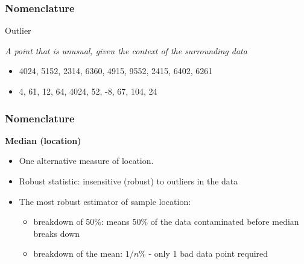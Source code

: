 \begin{frame}\frametitle{Nomenclature}
	\begin{block}
		{Outlier}
		\begin{center}
			\emph{A point that is unusual, given the context of the surrounding data}
		\end{center}
	\end{block}
	\begin{itemize}
		\item	4024, 5152, 2314, 6360, 4915, 9552, 2415, 6402, 6261
		\item	4, 61, 12, 64, 4024, 52, -8, 67, 104, 24
	\end{itemize}
\end{frame}

\begin{frame}\frametitle{Nomenclature}
	\textbf{Median (location)}
	\begin{itemize}
		\item	One alternative measure of location.
		\item	Robust statistic: insensitive (robust) to outliers in the data
		\item	The most robust estimator of sample location:
		\begin{itemize}
			\item	breakdown of 50\%: means 50\% of the data contaminated before median breaks down
			\item	breakdown of the mean: $1/n$\% - only 1 bad data point required
		\end{itemize}
	\end{itemize}
\end{frame}

